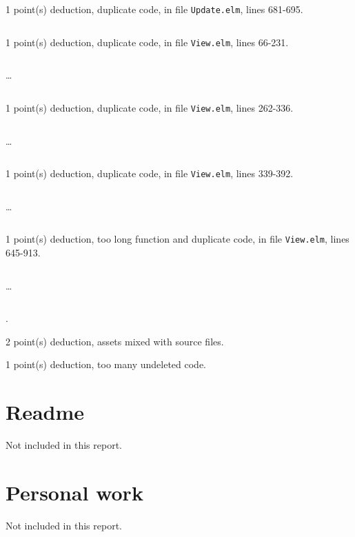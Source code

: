 \documentclass{article}
\begin{document}
1 point(s) {\color{red}deduction}, duplicate code, in file {\color{blue}\texttt{Update.elm}}, lines {\color{blue}681-695}.

\inputminted[firstline=681,lastline=695]{elm}{Update.elm}

1 point(s) {\color{red}deduction}, duplicate code, in file {\color{blue}\texttt{View.elm}}, lines {\color{blue}66-231}.

\inputminted[firstline=66,lastline=75]{elm}{View.elm}

\dots

\inputminted[firstline=222,lastline=231]{elm}{View.elm}

1 point(s) {\color{red}deduction}, duplicate code, in file {\color{blue}\texttt{View.elm}}, lines {\color{blue}262-336}.

\inputminted[firstline=262,lastline=271]{elm}{View.elm}

\dots

\inputminted[firstline=327,lastline=336]{elm}{View.elm}

1 point(s) {\color{red}deduction}, duplicate code, in file {\color{blue}\texttt{View.elm}}, lines {\color{blue}339-392}.

\inputminted[firstline=339,lastline=348]{elm}{View.elm}

\dots

\inputminted[firstline=383,lastline=392]{elm}{View.elm}

1 point(s) {\color{red}deduction}, too long function and duplicate code, in file {\color{blue}\texttt{View.elm}}, lines {\color{blue}645-913}.

\inputminted[firstline=645,lastline=654]{elm}{View.elm}

\dots

\inputminted[firstline=904,lastline=913]{elm}{View.elm}

.\medskip

2 point(s) {\color{red}deduction}, assets mixed with source files.\medskip

1 point(s) {\color{red}deduction}, too many undeleted code.\medskip



\newpage

\section{Readme}

Not included in this report.

\section{Personal work}

Not included in this report.


\newpage
\end{document}
